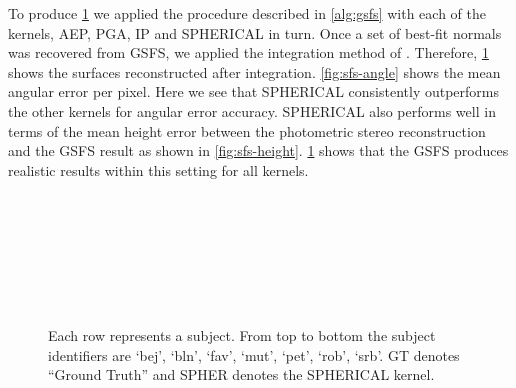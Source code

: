 To produce \cref{fig:sfs-results} we applied the procedure described in
\cref{alg:gsfs} with each of the kernels, AEP, PGA, IP and SPHERICAL
in turn. Once a set of best-fit normals was recovered from GSFS, we applied
the integration method of \citet{frankot1988method}.
Therefore, \cref{fig:sfs-results} shows the surfaces reconstructed
after integration. \cref{fig:sfs-angle} shows the mean angular error
per pixel. Here we see that SPHERICAL consistently outperforms the other
kernels for angular error accuracy. SPHERICAL also performs well in terms of
the mean height error between the photometric stereo reconstruction and the
GSFS result as shown in \cref{fig:sfs-height}. \cref{fig:sfs-results}
shows that the GSFS produces realistic results within this setting for all kernels.
\begin{figure}
    \centering
     \\
        \\
        \\
        \\
        \\
        \\
    \caption{Each row represents a subject. From top to bottom the subject
             identifiers are `bej', `bln', `fav', `mut', `pet', `rob', `srb'.
             GT denotes ``Ground Truth'' and SPHER denotes the SPHERICAL
             kernel.}
\label{fig:sfs-results}
\end{figure}
